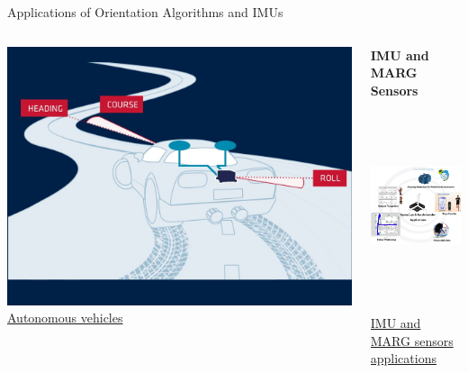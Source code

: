 \documentclass[aspectratio=169,xcolor=dvipsnames]{beamer}
\begin{document}
\begin{frame}{Applications of Orientation Algorithms and IMUs}
\begin{columns}[T, totalwidth=\textwidth]
\begin{column}{0.48\textwidth}
    \includegraphics[height=0.2\textheight]{logos/autonomous.jpg}\\[0.2em]
    \href{https://www.sbg-systems.com/vehicles/self-driving-cars/}{Autonomous vehicles}
  \end{column}

  \begin{column}{0.48\textwidth}
    \centering
    \textbf{IMU and MARG Sensors} \\[0.5em]

    \includegraphics[height=6.2cm]{logos/IMU-Applications-EN-768x671.png}\\[0.2em]
    \href{https://atadiat.com/en/e-towards-understanding-imu-basics-of-accelerometer-and-gyroscope-sensors/}{IMU and MARG sensors applications} \\[0.5em]

  \end{column}

\end{columns}
\end{frame}
\end{document}
